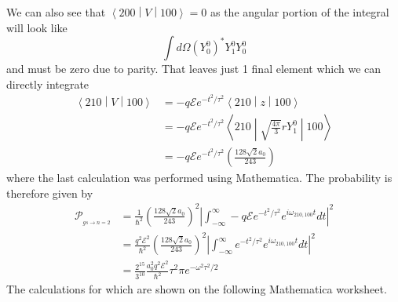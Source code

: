 \documentclass[a4paper, 11pt]{article}
\newcommand{\E}{\mathcal{E}}
\newcommand{\prob}[2]{\mathcal{P}_{_{#1\rightarrow #2}}}
\newcommand{\matrixel}[3]{\ensuremath{\left\langle #1 \middle| #2 \middle| #3 \right\rangle}}
\newenvironment{solution}{%
	\begin{list}{}{%
			\setlength{\topsep}{0pt}%
			\setlength{\leftmargin}{0.5cm}%
			\setlength{\rightmargin}{0.5cm}%
			\setlength{\listparindent}{\parindent}%
			\setlength{\itemindent}{\parindent}%
			\setlength{\parsep}{\parskip}%
		}%
		\item[]}{\end{list}}
\begin{document}
\begin{enumerate}[leftmargin=0em, label=\textbf{\arabic*}]
\begin{solution}
      We can also see that $\matrixel{200}{V}{100}=0$ as the angular portion of
      the integral will look like
      \begin{equation}
        \int d\Omega \left(Y_0^0\right)^*Y_1^0Y_0^0
      \end{equation}
      and must be zero due to parity.  That leaves just 1 final element which we
      can directly integrate
      \begin{align}
        \matrixel{210}{V}{100} &= -q\E e^{-t^2/\tau^2}\matrixel{210}{z}{100} \\
                               &= -q\E e^{-t^2/\tau^2}\matrixel{210}{\sqrt{\frac{4\pi}{3}}rY_1^0}{100}\\
                               &= -q\E e^{-t^2/\tau^2}\left(\frac{128\sqrt{2}a_0}{243}\right)
      \end{align}
      where the last calculation was performed using Mathematica. The
      probability is therefore given by
      \begin{align}
        \prob{gs}{n=2} &= \frac{1}{\hbar^2}\left(\frac{128\sqrt{2}a_0}{243}\right)^2\left| \int_{-\infty}^{\infty}-q\E e^{-t^2/\tau^2} e^{i\omega_{210,100}t} dt \right|^2\\
                       &= \frac{q^2\E^2}{\hbar^2}\left(\frac{128\sqrt{2}a_0}{243}\right)^2\left| \int_{-\infty}^{\infty} e^{-t^2/\tau^2} e^{i\omega_{210,100}t} dt \right|^2 \\
        &= \frac{2^{15}}{3^{10}}\frac{a_0^2 q^2 \E^2}{\hbar^2}\tau^2\pi e^{-\omega^2\tau^2/2}
      \end{align}
      The calculations for which are shown on the following Mathematica
      worksheet.

      


\end{solution}
\end{enumerate}
\end{document}
